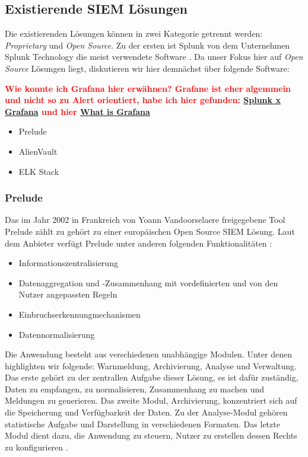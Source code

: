 \subsection{Existierende SIEM Lösungen}

Die existierenden  Lösungen können in zwei Kategorie getrennt werden: \textit{\gls{Proprietary}} und \textit{\gls{Open Source}}. Zu der ersten ist Splunk von dem Unternehmen Splunk Technology die meist verwendete Software \citep{Kazarov_Splunk}. Da unser Fokus hier auf \textit{\gls{Open Source}} Lösungen liegt, diskutieren wir hier demnächst über folgende Software:

\textbf{\textcolor{red}{Wie konnte ich Grafana hier erwähnen? Grafane ist eher algemmein und nicht so zu Alert orientiert, habe ich hier gefunden: \href{https://www.metricfire.com/blog/grafana-vs-splunk/}{Splunk x Grafana} und hier \href{https://www.researchgate.net/publication/350730340_Implementation_of_Grafana_as_open_source_visualization_and_query_processing_platform_for_data_scientists_and_researchers}{What is Grafana}}  }

\begin{itemize}[noitemsep]
   \item Prelude
   \item AlienVault 
   \item ELK Stack
\end{itemize}

\subsubsection{Prelude}
Das im Jahr 2002 in Frankreich von Yoann Vandoorselaere freigegebene Tool Prelude zählt zu gehört zu einer europäischen \gls{Open Source} \gls{SIEM} Lösung. Laut dem Anbieter verfügt Prelude unter anderen folgenden Funktionalitäten \citep{Prelude_SIEM}:

\begin{itemize}[noitemsep]
   \item Informationszentralisierung
   \item Datenaggregation und -Zusammenhang mit vordefinierten und von den Nutzer angepassten Regeln 
   \item Einbruchserkennungmechanismen
   \item Datennormalisierung
\end{itemize}

Die Anwendung besteht aus verschiedenen unabhängige Modulen. Unter denen highlighten wir folgende: Warnmeldung, Archivierung, Analyse und Verwaltung. Das erste gehört zu der zentrallen Aufgabe dieser Lösung, es ist dafür zuständig, Daten zu empfangen, zu normalisieren, Zusammenhang zu machen und Meldungen zu generieren. Das zweite Modul, Archivierung, konzentriert sich auf die Speicherung und Verfügbarkeit der Daten. Zu der Analyse-Modul gehören statistische Aufgabe und Darstellung in verschiedenen Formaten. Das letzte Modul dient dazu, die Anwendung zu steuern, Nutzer zu erstellen dessen Rechts zu konfigurieren \citep{EC_Prelude}.

